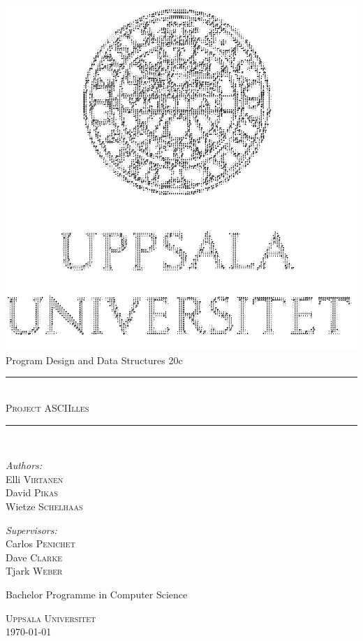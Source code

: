 \documentclass[12pt, a4paper]{article}
\newcommand{\HRule}{\rule{\linewidth}{0.6mm}}
\newcommand{\names}{Elli \textsc{Virtanen}\\
					David \textsc{Pikas}\\
					Wietze \textsc{Schelhaas}}
\newcommand{\teacher}{Carlos \textsc{Penichet}\\
					  Dave \textsc{Clarke}\\
					  Tjark \textsc{Weber}}
\newcommand{\rapportnamn}{Project ASCIIlles}
\newcommand{\kursnamn}{Program Design and Data Structures 20c}
\begin{document}
\begin{titlepage}
	\begin{center}

	\includegraphics[scale=0.35]{uu_ascii.png} \\[1.5cm]
	\Large{\kursnamn}\\ 
	\HRule \\[0.5cm]
	\textsc{\huge{\rapportnamn}}\\
	\HRule \\[0.5cm]
	\vspace{15 mm}


\begin{minipage}{0.4\textwidth}
	\begin{flushleft} \large
		\emph{Authors:}\\
		\names\\
	\end{flushleft}
\end{minipage}
\hfill
\begin{minipage}{0.4\textwidth}
	\begin{flushright} \large
		\emph{Supervisors:}\\
		\teacher\\
	\end{flushright}
\end{minipage}

\vfill
\large Bachelor Programme in Computer Science

\textsc{\large Uppsala Universitet \\ \today}

\end{center}
\end{titlepage}
\end{document}
